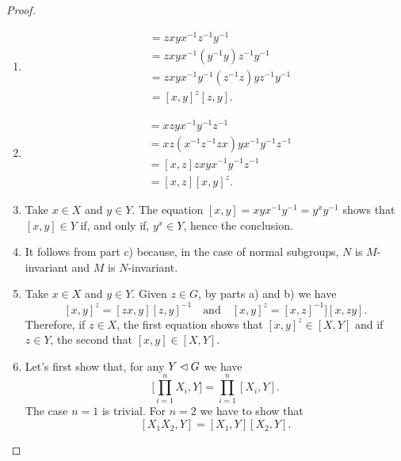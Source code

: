 \begin{proof}${}$
\begin{enumerate}[\upshape a)]
    \item 
    \begin{align*}
        [zx,y] &= zxyx^{-1}z^{-1}y^{-1}\\
            &= zxyx^{-1}(y^{-1}y)z^{-1}y^{-1}\\
            &= zxyx^{-1}y^{-1}(z^{-1}z)yz^{-1}y^{-1}\\
            &= [x,y]^z[z,y].
    \end{align*}

    \item
    \begin{align*}
        [x,zy] &= xzyx^{-1}y^{-1}z^{-1}\\
            &= xz(x^{-1}z^{-1}zx)yx^{-1}y^{-1}z^{-1}\\
            &= [x,z]zxyx^{-1}y^{-1}z^{-1}\\
            &= [x,z][x,y]^z.
    \end{align*}

    \item Take $x\in X$ and $y\in Y$. The equation $[x,y]=xyx^{-1}y^{-1}=y^xy^{-1}$ shows that $[x,y]\in Y$ if, and only if, $y^x\in Y$, hence the conclusion.

    \item It follows from part c) because, in the case of normal subgroups, $N$ is $M$-invariant and $M$ is $N$-invariant.
    
    \item Take $x\in X$ and $y\in Y$. Given $z\in G$, by parts a) and b) we have
    $$
        [x,y]^z=[zx,y][z,y]^{-1}\quad\text{and}\quad [x,y]^z=[x,z]^{-1}][x,zy].
    $$
    Therefore, if $z\in X$, the first equation shows that $[x,y]^z\in [X,Y]$ and if $z\in Y$, the second that $[x,y]\in[X,Y]$.

    \item Let's first show that, for any $Y\lhd G$ we have
    $$
        \Big[\prod_{i=1}^nX_i,Y\Big]=\prod_{i=1}^n[X_i,Y].
    $$
    The case $n=1$ is trivial. For $n=2$ we have to show that
    \begin{equation}\label{eq.f}
        [X_1X_2,Y] = [X_1,Y][X_2,Y].
    \end{equation}


\end{enumerate}
\end{proof}
